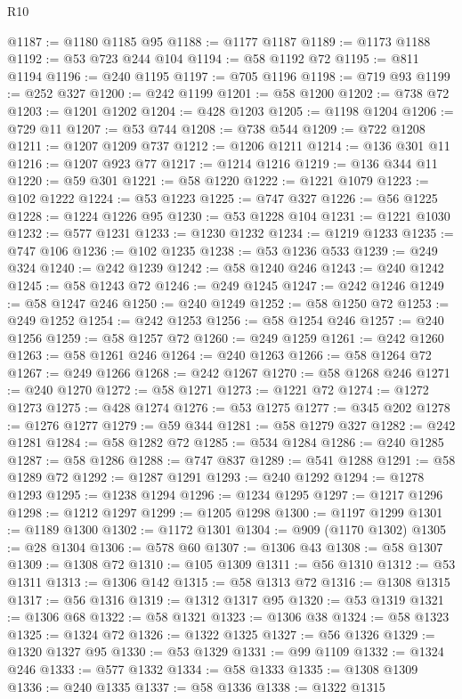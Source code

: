 \begin{lexlean}{R10}
\begin{coremodule}
@1187 := @1180 @1185 @95
@1188 := @1177 @1187
@1189 := @1173 @1188
@1192 := @53 @723 @244 @104
@1194 := @58 @1192 @72
@1195 := @811 @1194
@1196 := @240 @1195
@1197 := @705 @1196
@1198 := @719 @93
@1199 := @252 @327
@1200 := @242 @1199
@1201 := @58 @1200
@1202 := @738 @72
@1203 := @1201 @1202
@1204 := @428 @1203
@1205 := @1198 @1204
@1206 := @729 @11
@1207 := @53 @744
@1208 := @738 @544
@1209 := @722 @1208
@1211 := @1207 @1209 @737
@1212 := @1206 @1211
@1214 := @136 @301 @11
@1216 := @1207 @923 @77
@1217 := @1214 @1216
@1219 := @136 @344 @11
@1220 := @59 @301
@1221 := @58 @1220
@1222 := @1221 @1079
@1223 := @102 @1222
@1224 := @53 @1223
@1225 := @747 @327
@1226 := @56 @1225
@1228 := @1224 @1226 @95
@1230 := @53 @1228 @104
@1231 := @1221 @1030
@1232 := @577 @1231
@1233 := @1230 @1232
@1234 := @1219 @1233
@1235 := @747 @106
@1236 := @102 @1235
@1238 := @53 @1236 @533
@1239 := @249 @324
@1240 := @242 @1239
@1242 := @58 @1240 @246
@1243 := @240 @1242
@1245 := @58 @1243 @72
@1246 := @249 @1245
@1247 := @242 @1246
@1249 := @58 @1247 @246
@1250 := @240 @1249
@1252 := @58 @1250 @72
@1253 := @249 @1252
@1254 := @242 @1253
@1256 := @58 @1254 @246
@1257 := @240 @1256
@1259 := @58 @1257 @72
@1260 := @249 @1259
@1261 := @242 @1260
@1263 := @58 @1261 @246
@1264 := @240 @1263
@1266 := @58 @1264 @72
@1267 := @249 @1266
@1268 := @242 @1267
@1270 := @58 @1268 @246
@1271 := @240 @1270
@1272 := @58 @1271
@1273 := @1221 @72
@1274 := @1272 @1273
@1275 := @428 @1274
@1276 := @53 @1275
@1277 := @345 @202
@1278 := @1276 @1277
@1279 := @59 @344
@1281 := @58 @1279 @327
@1282 := @242 @1281
@1284 := @58 @1282 @72
@1285 := @534 @1284
@1286 := @240 @1285
@1287 := @58 @1286
@1288 := @747 @837
@1289 := @541 @1288
@1291 := @58 @1289 @72
@1292 := @1287 @1291
@1293 := @240 @1292
@1294 := @1278 @1293
@1295 := @1238 @1294
@1296 := @1234 @1295
@1297 := @1217 @1296
@1298 := @1212 @1297
@1299 := @1205 @1298
@1300 := @1197 @1299
@1301 := @1189 @1300
@1302 := @1172 @1301
@1304 := @909 (@1170 @1302)
@1305 := @28 @1304
@1306 := @578 @60
@1307 := @1306 @43
@1308 := @58 @1307
@1309 := @1308 @72
@1310 := @105 @1309
@1311 := @56 @1310
@1312 := @53 @1311
@1313 := @1306 @142
@1315 := @58 @1313 @72
@1316 := @1308 @1315
@1317 := @56 @1316
@1319 := @1312 @1317 @95
@1320 := @53 @1319
@1321 := @1306 @68
@1322 := @58 @1321
@1323 := @1306 @38
@1324 := @58 @1323
@1325 := @1324 @72
@1326 := @1322 @1325
@1327 := @56 @1326
@1329 := @1320 @1327 @95
@1330 := @53 @1329
@1331 := @99 @1109
@1332 := @1324 @246
@1333 := @577 @1332
@1334 := @58 @1333
@1335 := @1308 @1309
@1336 := @240 @1335
@1337 := @58 @1336
@1338 := @1322 @1315

\end{coremodule}
\end{lexlean}
